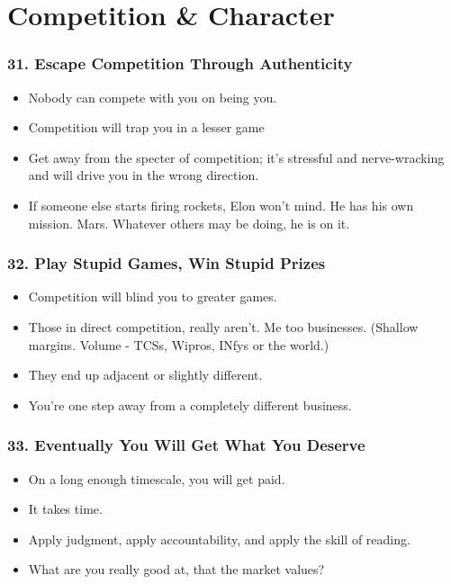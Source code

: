 \section{Competition \& Character}

\begin{frame}[fragile]
\frametitle{31. Escape Competition Through Authenticity}
\begin{itemize}
\item Nobody can compete with you on being you.
\item Competition will trap you in a lesser game
\item Get away from the specter of competition; it's stressful and nerve-wracking and will drive you in the wrong direction.
\item If someone else starts firing rockets, Elon won't mind. He has his own mission. Mars. Whatever others may be doing, he is on it.
\end{itemize}
\end{frame}


\begin{frame}[fragile]
\frametitle{32. Play Stupid Games, Win Stupid Prizes}
\begin{itemize}
\item Competition will blind you to greater games.
\item Those in direct competition, really aren't. Me too businesses. (Shallow margins. Volume - TCSs, Wipros, INfys or the world.)
\item They end up adjacent or slightly different. 
\item You're one step away from a completely different business.
\end{itemize}
\end{frame}

\begin{frame}[fragile]
\frametitle{33. Eventually You Will Get What You Deserve}
\begin{itemize}
\item On a long enough timescale, you will get paid.
\item It takes time.
\item  Apply judgment, apply accountability, and apply the skill of reading.
\item What are you really good at, that the market values?
\end{itemize}
\end{frame}

